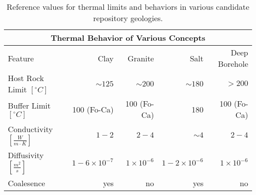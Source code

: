 %
\begin{table}[h!]
  \centering
  \footnotesize{
  \begin{tabular}{|l|r|r|r|r|}
    \multicolumn{5}{c}{\textbf{Thermal Behavior of Various Concepts}}\\
    \hline
    Feature & Clay & Granite & Salt & Deep Borehole \\ 
    \hline
    Host Rock Limit $[^{\circ}C]$ & $\sim125$ & $\sim200$ & $\sim180$ & $>200$ \\ 
    Buffer Limit $[^{\circ}C]$ & 100 (Fo-Ca) & 100 (Fo-Ca) & 180 & 100 (Fo-Ca)\\ 
    Conductivity $[\frac{W}{m{\cdot}K}]$ & $1-2$ & $2-4$ & $\sim4$  & $2-4$ \\ 
    Diffusivity $[\frac{m^2}{s}]$ & $1-6\times10^{-7}$ & $1\times10^{-6}$ & $1-2\times10^{-6}$  & $1\times10^{-6}$ \\ 
    Coalesence & yes & no & yes & no \\ 
    \hline
  \end{tabular}
  \caption{Reference values for thermal limits and behaviors in various 
  candidate repository geologies.}
  }
  \label{tab:geos_tab}
\end{table}
